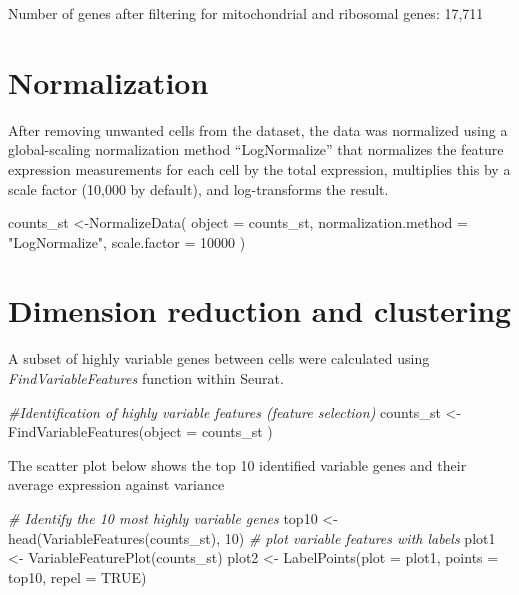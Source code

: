 \documentclass[
  openany]{book}
\newenvironment{Shaded}{\begin{snugshade}}{\end{snugshade}}
\newcommand{\AttributeTok}[1]{\textcolor[rgb]{0.77,0.63,0.00}{#1}}
\newcommand{\CommentTok}[1]{\textcolor[rgb]{0.56,0.35,0.01}{\textit{#1}}}
\newcommand{\ConstantTok}[1]{\textcolor[rgb]{0.00,0.00,0.00}{#1}}
\newcommand{\DecValTok}[1]{\textcolor[rgb]{0.00,0.00,0.81}{#1}}
\newcommand{\FunctionTok}[1]{\textcolor[rgb]{0.00,0.00,0.00}{#1}}
\newcommand{\NormalTok}[1]{#1}
\newcommand{\OtherTok}[1]{\textcolor[rgb]{0.56,0.35,0.01}{#1}}
\newcommand{\StringTok}[1]{\textcolor[rgb]{0.31,0.60,0.02}{#1}}
\begin{document}
Number of genes after filtering for mitochondrial and ribosomal genes: 17,711

\hypertarget{normalization}{%
\section{Normalization}\label{normalization}}

After removing unwanted cells from the dataset, the data was normalized using a global-scaling normalization method ``LogNormalize'' that normalizes the feature expression measurements for each cell by the total expression, multiplies this by a scale factor (10,000 by default), and log-transforms the result.

\begin{Shaded}
\begin{Highlighting}[]
\NormalTok{counts\_st }\OtherTok{\textless{}{-}}\FunctionTok{NormalizeData}\NormalTok{(}
    \AttributeTok{object =}\NormalTok{ counts\_st,}
    \AttributeTok{normalization.method =} \StringTok{"LogNormalize"}\NormalTok{,}
    \AttributeTok{scale.factor =} \DecValTok{10000}
\NormalTok{  )}
\end{Highlighting}
\end{Shaded}

\hypertarget{dimension-reduction-and-clustering}{%
\section{Dimension reduction and clustering}\label{dimension-reduction-and-clustering}}

A subset of highly variable genes between cells were calculated using \emph{FindVariableFeatures} function within Seurat.

\begin{Shaded}
\begin{Highlighting}[]
\CommentTok{\#Identification of highly variable features (feature selection)}
\NormalTok{counts\_st }\OtherTok{\textless{}{-}} \FunctionTok{FindVariableFeatures}\NormalTok{(}\AttributeTok{object =}\NormalTok{ counts\_st )}
\end{Highlighting}
\end{Shaded}

The scatter plot below shows the top 10 identified variable genes and their average expression against variance

\begin{Shaded}
\begin{Highlighting}[]
\CommentTok{\# Identify the 10 most highly variable genes}
\NormalTok{top10 }\OtherTok{\textless{}{-}} \FunctionTok{head}\NormalTok{(}\FunctionTok{VariableFeatures}\NormalTok{(counts\_st), }\DecValTok{10}\NormalTok{)}
\CommentTok{\# plot variable features with labels}
\NormalTok{plot1 }\OtherTok{\textless{}{-}} \FunctionTok{VariableFeaturePlot}\NormalTok{(counts\_st)}
\NormalTok{plot2 }\OtherTok{\textless{}{-}} \FunctionTok{LabelPoints}\NormalTok{(}\AttributeTok{plot =}\NormalTok{ plot1, }\AttributeTok{points =}\NormalTok{ top10, }\AttributeTok{repel =} \ConstantTok{TRUE}\NormalTok{)}
\end{Highlighting}
\end{Shaded}
\end{document}
